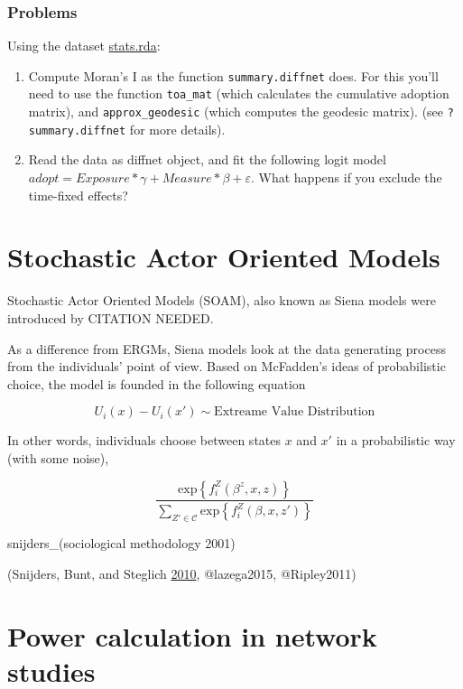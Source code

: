 \documentclass[]{book}
\begin{document}
\hypertarget{problems-2}{%
\subsection{Problems}\label{problems-2}}

Using the dataset \url{stats.rda}:

\begin{enumerate}
\def\labelenumi{\arabic{enumi}.}
\item
  Compute Moran's I as the function \texttt{summary.diffnet} does. For this you'll need
  to use the function \texttt{toa\_mat} (which calculates the cumulative adoption matrix),
  and \texttt{approx\_geodesic} (which computes the geodesic matrix). (see \texttt{?summary.diffnet}
  for more details).
\item
  Read the data as diffnet object, and fit the following logit model \(adopt = Exposure*\gamma + Measure*\beta + \varepsilon\).
  What happens if you exclude the time-fixed effects?
\end{enumerate}

\hypertarget{stochastic-actor-oriented-models}{%
\chapter{Stochastic Actor Oriented Models}\label{stochastic-actor-oriented-models}}

Stochastic Actor Oriented Models (SOAM), also known as Siena models were introduced by CITATION NEEDED.

As a difference from ERGMs, Siena models look at the data generating process from the individuals' point of view. Based on McFadden's ideas of probabilistic choice, the model is founded in the following equation

\[
U_i(x) - U_i(x') \sim \mbox{Extreame Value Distribution}
\]

In other words, individuals choose between states \(x\) and \(x'\) in a probabilistic way (with some noise),

\[
\frac{\mbox{exp}\left\{f_i^Z(\beta^z,x, z)\right\}}{\sum_{Z'\in\mathcal{C}}\mbox{exp}\left\{f_i^{Z}(\beta, x, z')\right\}}
\]

snijders\_(sociological methodology 2001)

(Snijders, Bunt, and Steglich \protect\hyperlink{ref-Snijders2010}{2010}, @lazega2015, @Ripley2011)

\hypertarget{power-calculation-in-network-studies}{%
\chapter{Power calculation in network studies}\label{power-calculation-in-network-studies}}
\end{document}
